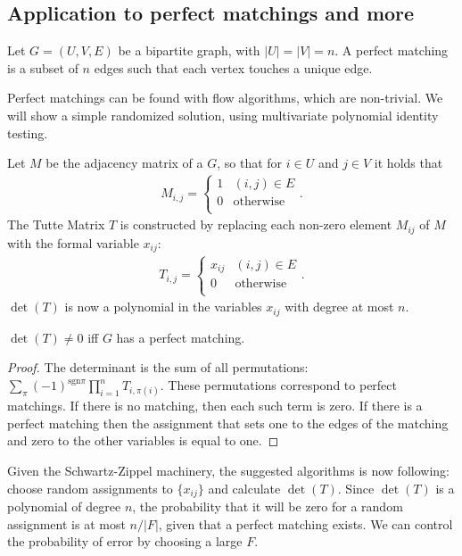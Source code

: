 \documentclass{article}
\begin{document}
\subsection{Application to perfect matchings and more}
Let $G=(U,V,E)$ be a bipartite graph, with $|U|=|V|=n$. A perfect
matching is a subset of $n$ edges such that each vertex touches a
unique edge.

Perfect matchings can be found with flow algorithms, which are
non-trivial. We will show a simple randomized solution, using
multivariate polynomial identity testing.

Let $M$ be the adjacency matrix of a $G$, so that for $i \in U$ and $j
\in V$ it holds that
\begin{align*}
M_{i,j}=
\begin{cases}
  1 & (i,j)\in E \\
  0 & \mathrm{otherwise} \\
\end{cases}.  
\end{align*}
The Tutte Matrix $T$ is constructed by replacing each non-zero element
$M_{ij}$ of $M$ with the formal variable $x_{ij}$:
\begin{align*}
T_{i,j}=
\begin{cases}
  x_{ij} & (i,j)\in E \\
  0 & \mathrm{otherwise} \\
\end{cases}.  
\end{align*}
$\det(T)$ is now a polynomial in the variables $x_{ij}$ with degree at
most $n$.

\begin{claim}
$\det(T)\neq 0$ iff $G$ has a perfect matching.  
\end{claim}
\begin{proof}
  The determinant is the sum of all permutations:
  $\sum_{\pi}(-1)^{\mathrm{sgn}
    \pi}\prod_{i=1}^{n}T_{i,\pi(i)}$. These permutations correspond to
  perfect matchings. If there is no matching, then each such term is
  zero. If there is a perfect matching then the assignment that sets
  one to the edges of the matching and zero to the other variables is
  equal to one.
\end{proof}

Given the Schwartz-Zippel machinery, the suggested algorithms is now
following: choose random assignments to $\{x_{ij}\}$ and calculate
$\det(T)$. Since $\det(T)$ is a polynomial of degree $n$, the
probability that it will be zero for a random assignment is at most
$n/|F|$, given that a perfect matching exists. We can control the
probability of error by choosing a large $F$.
\end{document}
